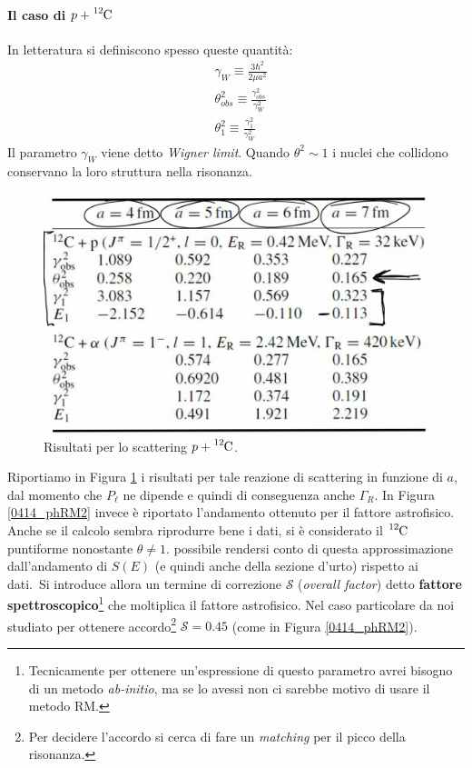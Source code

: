 \paragraph{Il caso di $p + \ce{^{12}C}$}
In letteratura si definiscono spesso queste quantità:
\begin{align*}
	&\gamma_W \equiv \frac{3\hbar^2}{2\mu a^2} \\
	&\theta_{obs}^2 \equiv \frac{\gamma^2_{obs}}{\gamma_W^2} \\
	&\theta_{1}^2 \equiv \frac{\gamma^2_{1}}{\gamma_W^2}
\end{align*}
Il parametro $\gamma_W$ viene detto \textit{Wigner limit}. Quando $\theta^2\sim 1$ i nuclei che collidono conservano la loro struttura nella risonanza.
\begin{figure}[!h]
	\centering
	\includegraphics[scale=0.3]{Immagini/0414_RM.png}
	\caption{Risultati per lo scattering $p + \ce{^{12}C}$.}
	\label{0414_phRM1}
\end{figure}
\noindent Riportiamo in Figura \ref{0414_phRM1} i risultati per tale reazione di scattering in funzione di $a$, dal momento che $P_\ell$ ne dipende e quindi di conseguenza anche $\Gamma_R$. In Figura \ref{0414_phRM2} invece è riportato l'andamento ottenuto per il fattore astrofisico. Anche se il calcolo sembra riprodurre bene i dati, si è considerato il $\ce{^{12}C}$ puntiforme nonostante $\theta\not = 1$.  possibile rendersi conto di questa approssimazione dall'andamento di $S(E)$ (e quindi anche della sezione d'urto) rispetto ai dati.\ Si introduce allora un termine di correzione $\mathcal{S}$ (\textit{overall factor}) detto \textbf{fattore spettroscopico}\footnote{Tecnicamente per ottenere un'espressione di questo parametro avrei bisogno di un metodo \textit{ab-initio}, ma se lo avessi non ci sarebbe motivo di usare il metodo RM.} che moltiplica il fattore astrofisico. Nel caso particolare da noi studiato per ottenere accordo\footnote{Per decidere l'accordo si cerca di fare un \textit{matching} per il picco della risonanza.} $\mathcal{S} = 0.45$ (come in Figura \ref{0414_phRM2}).
